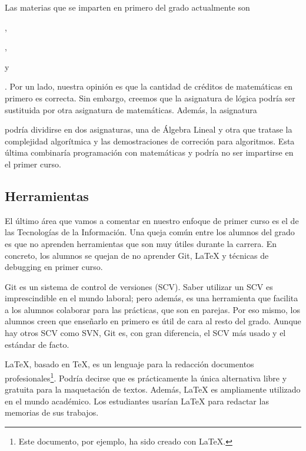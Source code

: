 Las materias que se imparten en primero del grado actualmente son
\subject{Álgebra y Matemática Discreta},
\subject{Fundamentos Lógicos de la Informática}\footnotemark,
\subject{Cálculo} y
\subject{Estadística}.
Por un lado, nuestra opinión es que
la cantidad de créditos de matemáticas en primero es correcta.
Sin embargo, creemos que la asignatura de lógica
podría ser sustituida por otra asignatura de matemáticas.
Además, la asignatura \subject{Álgebra y Matemática Discreta}
podría dividirse en dos asignaturas,
una de Álgebra Lineal y otra que tratase
la complejidad algorítmica y las demostraciones de correción para algoritmos.
Esta última combinaría programación con matemáticas
y podría no ser impartirse en el primer curso.


\subsection{Herramientas}


El último área que vamos a comentar en nuestro enfoque de primer curso
es el de las Tecnologías de la Información.
Una queja común entre los alumnos del grado es que
no aprenden herramientas que son muy útiles durante la carrera.
En concreto, los alumnos se quejan de no aprender
Git, \LaTeX{} y técnicas de debugging en primer curso.

Git es un sistema de control de versiones (SCV).
Saber utilizar un SCV es imprescindible en el mundo laboral;
pero además,
es una herramienta que facilita a los alumnos colaborar para las prácticas,
que son en parejas.
Por eso mismo, los alumnos creen que enseñarlo en primero
es útil de cara al resto del grado.
Aunque hay otros SCV como SVN,
Git es, con gran diferencia, el SCV más usado y el estándar de facto.

\LaTeX, basado en \TeX, es un lenguaje para
la redacción documentos profesionales\footnote{
    Este documento, por ejemplo, ha sido creado con \LaTeX.
}.
Podría decirse que es prácticamente la única alternativa
libre y gratuita para la maquetación de textos.
Además, \LaTeX{} es ampliamente utilizado en el mundo académico.
Los estudiantes usarían \LaTeX{} para redactar las memorias de sus trabajos.

